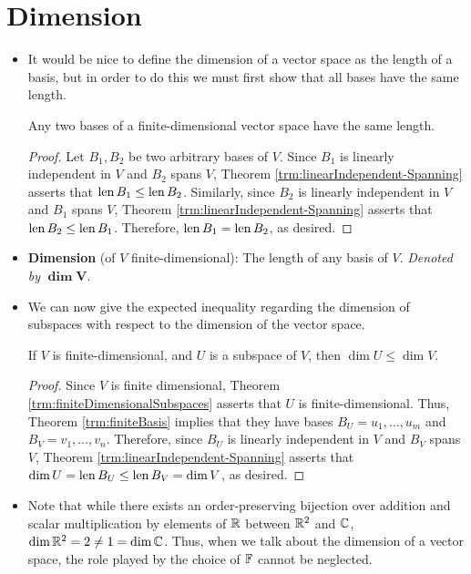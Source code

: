 \documentclass[../main.tex]{subfiles}
\begin{document}
\section{Dimension}
\begin{itemize}
    \item It would be nice to define the dimension of a vector space as the length of a basis, but in order to do this we must first show that all bases have the same length.
    \begin{theorem}\label{trm:sameBasisLength}
        Any two bases of a finite-dimensional vector space have the same length.
        \begin{proof}
            Let $B_1,B_2$ be two arbitrary bases of $V$. Since $B_1$ is linearly independent in $V$ and $B_2$ spans $V$, Theorem \ref{trm:linearIndependent-Spanning} asserts that $\operatorname{len} B_1\leq\operatorname{len} B_2$. Similarly, since $B_2$ is linearly independent in $V$ and $B_1$ spans $V$, Theorem \ref{trm:linearIndependent-Spanning} asserts that $\operatorname{len} B_2\leq\operatorname{len} B_1$. Therefore, $\operatorname{len} B_1=\operatorname{len} B_2$, as desired.
        \end{proof}
    \end{theorem}
    \item \textbf{Dimension} (of $V$ finite-dimensional): The length of any basis of $V$. \emph{Denoted by} $\bm{\dim V}$.
    \item We can now give the expected inequality regarding the dimension of subspaces with respect to the dimension of the vector space.
    \begin{theorem}\label{trm:dimSubspaces}
        If $V$ is finite-dimensional, and $U$ is a subspace of $V$, then $\dim U\leq\dim V$.
        \begin{proof}
            Since $V$ is finite dimensional, Theorem \ref{trm:finiteDimensionalSubspaces} asserts that $U$ is finite-dimensional. Thus, Theorem \ref{trm:finiteBasis} implies that they have bases $B_U=u_1,\dots,u_m$ and $B_V=v_1,\dots,v_n$. Therefore, since $B_U$ is linearly independent in $V$ and $B_V$ spans $V$, Theorem \ref{trm:linearIndependent-Spanning} asserts that $\dim U=\operatorname{len} B_U\leq\operatorname{len} B_V=\dim V$, as desired.
        \end{proof}
    \end{theorem}
    \item Note that while there exists an order-preserving bijection over addition and scalar multiplication by elements of $\mathbb{R}$ between $\mathbb{R}^2$ and $\mathbb{C}$, $\dim\mathbb{R}^2=2\neq 1=\dim\mathbb{C}$. Thus, when we talk about the dimension of a vector space, the role played by the choice of $\mathbb{F}$ cannot be neglected.

\end{itemize}
\end{document}
